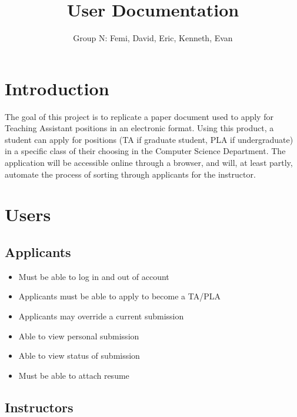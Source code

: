 \documentclass[11pt]{amsart}
\title{User Documentation}
\author{Group N: Femi, David, Eric, Kenneth, Evan}
\begin{document}
\maketitle
\section{Introduction}
\noindent The goal of this project is to replicate a paper document used to apply for Teaching Assistant positions in an electronic format. Using this product, a student can apply for positions (TA if graduate student, PLA if undergraduate) in a specific class of their choosing in the Computer Science Department. The application will be accessible online through a browser, and will, at least partly, automate the process of sorting through applicants for the instructor.
\section{Users}
\subsection{Applicants}
\begin{itemize}
\item{Must be able to log in and out of account}


\item{Applicants must be able to apply to become a TA/PLA}


\item{Applicants may override a current submission}


\item{Able to view personal submission}


\item{Able to view status of submission}


\item{Must be able to attach resume}


\end{itemize}

\subsection{Instructors}
\end{document}
